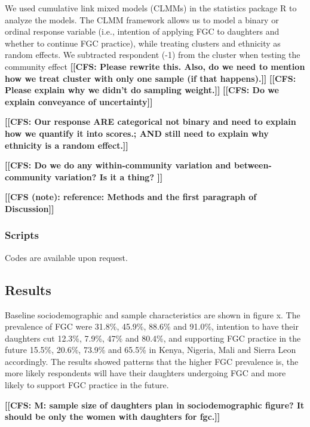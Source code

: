 \documentclass[12pt,]{article}
\newcommand{\comment}[1]{\textbf{[[#1]]}}
\newcommand{\cfcmt}[1]{\comment{CFS: #1}}
\newcommand{\cfonly}[1]{\comment{CFS (note): #1}}
\begin{document}
We used cumulative link mixed models (CLMMs) in the statistics package R \cite{Rstats,Rpackage_ordinal} to analyze the models.  The CLMM framework allows us to model a binary or ordinal response variable (i.e., intention of applying FGC to daughters and whether to continue FGC practice), while treating clusters and ethnicity as random effects.  
We subtracted respondent (-1) from the cluster when testing the community effect \cfcmt{Please rewrite this. Also, do we need to mention how we treat cluster with only one sample (if that happens).}
\cfcmt{Please explain why we didn’t do sampling weight.}
\cfcmt{Do we explain conveyance of uncertainty}

\cfcmt{Our response ARE categorical not binary and need to explain how we quantify it into scores.; AND still need to explain why ethnicity is a random effect.}

\cfcmt{Do we do any within-community variation and between-community variation?  Is it a thing?
}

\cfonly{reference: Methods and the first paragraph of Discussion\cite{Chia14}}


\subsubsection{Scripts}\label{scripts}

Codes are available upon request. 

\subsection{Results}\label{results-1}

Baseline sociodemographic and sample characteristics are shown in figure x.  The prevalence of FGC were 31.8\%, 45.9\%, 88.6\% and 91.0\%, intention to have their daughters cut 12.3\%, 7.9\%, 47\% and 80.4\%, and supporting FGC practice in the future 15.5\%, 20.6\%, 73.9\% and 65.5\% in Kenya, Nigeria, Mali and Sierra Leon accordingly.  The results showed patterns that the higher FGC prevalence is, the more likely respondents will have their daughters undergoing FGC and more likely to support FGC practice in the future.  

\cfcmt{M: sample size of daughters plan in sociodemographic figure?  It should be only the women with daughters for fgc.}
\end{document}
